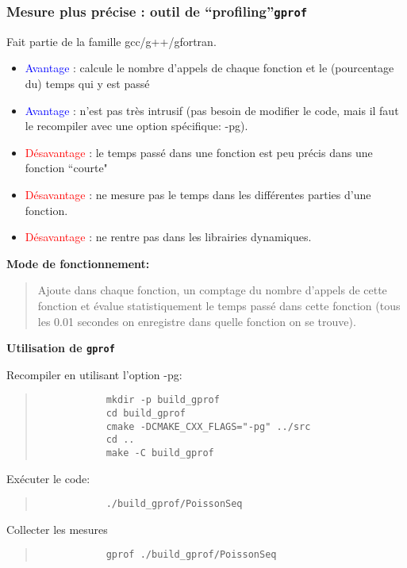 \documentclass{beamer}
\begin{document}
\begin{frame}
	\frametitle{Mesure plus pr\'ecise : outil de ``profiling''{\tt gprof}}
    
	\vfill
	Fait partie de la famille gcc/g++/gfortran.
	
	
	\begin{itemize}
	\item \textcolor{blue}{Avantage} : calcule le nombre d'appels de chaque fonction et le (pourcentage du) temps qui y est pass\'e
	\item \textcolor{blue}{Avantage} : n'est pas tr\`es intrusif (pas besoin de modifier le code, mais il faut le recompiler avec une option sp\'ecifique: -pg).
	\item \textcolor{red}{D\'esavantage} : le temps pass\'e dans une fonction est peu pr\'ecis dans une fonction ``courte"
	\item \textcolor{red}{D\'esavantage} : ne mesure pas le temps dans les diff\'erentes parties d'une fonction.
	\item \textcolor{red}{D\'esavantage} : ne rentre pas dans les librairies dynamiques.
\end{itemize}
	\vfill
\end{frame}
\begin{frame}[fragile]
	
{\bf 	Mode de fonctionnement:}
	\begin{quote}
		Ajoute dans chaque fonction, un comptage du nombre d'appels de cette fonction et \'evalue statistiquement le temps pass\'e dans cette fonction (tous les 0.01 secondes on enregistre dans quelle fonction on se trouve).
	\end{quote} 

	\vfill
{\bf Utilisation de {\tt gprof}}
	\vfill

Recompiler en utilisant l'option -pg:
	\begin{quote}
		\begin{verbatim}
			mkdir -p build_gprof
			cd build_gprof
			cmake -DCMAKE_CXX_FLAGS="-pg" ../src
			cd ..
			make -C build_gprof
		\end{verbatim}
	\end{quote} 

Exécuter le code:
		\begin{quote}
		\begin{verbatim}
			./build_gprof/PoissonSeq
		\end{verbatim}
		\end{quote}
	
Collecter les mesures
		\begin{quote}
		\begin{verbatim}
			gprof ./build_gprof/PoissonSeq
		\end{verbatim}
		\end{quote}

\end{frame}
\end{document}
